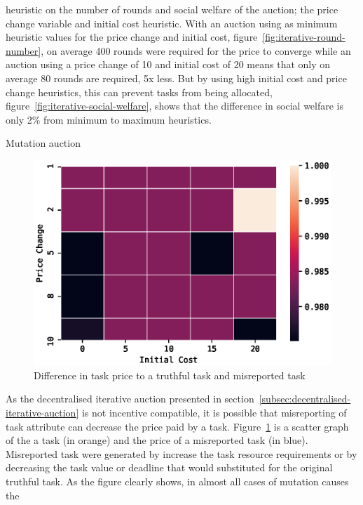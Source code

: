 heuristic on the number of rounds and social welfare of the auction; the price change variable and initial cost
heuristic. With an auction using as minimum heuristic values for the price change and initial cost,
figure~\ref{fig:iterative-round-number}, on average 400 rounds were required for the price to converge while an auction
using a price change of 10 and initial cost of 20 means that only on average 80 rounds are required, 5x less. But by
using high initial cost and price change heuristics, this can prevent tasks from being allocated,
figure~\ref{fig:iterative-social-welfare}, shows that the difference in social welfare is only 2\% from minimum to
maximum heuristics.

Mutation auction
 \begin{figure}
    \centering
    \includegraphics[width=\linewidth]{figs/empirical_evidence/iterative_round_number}  %
    \caption{Difference in task price to a truthful task and misreported task}
    \label{fig:auction-mutation}
\end{figure}
As the decentralised iterative auction presented in section~\ref{subsec:decentralised-iterative-auction} is not
incentive compatible, it is possible that misreporting of task attribute can decrease the price paid by a task.
Figure~\ref{fig:auction-mutation} is a scatter graph of the  a task (in orange) and the price of a misreported task
(in blue). Misreported task were generated by increase the task resource requirements or by decreasing the task value
or deadline that would substituted for the original truthful task. As the figure clearly shows, in almost all cases of
mutation causes the